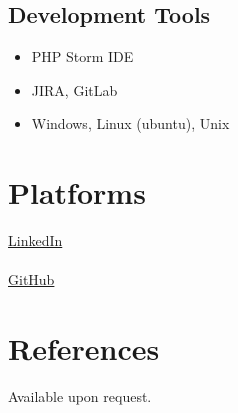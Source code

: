 \documentclass[a4paper, 10pt]{article}
\begin{document}
	\subsection*{Development Tools}
	\begin{itemize}
		\item PHP Storm IDE
		\item JIRA, GitLab
		\item Windows, Linux (ubuntu), Unix 
	\end{itemize}
	\section*{Platforms}
	\href{https://www.linkedin.com/in/david-buttler/}{LinkedIn}\\\\
	\href{https://github.com/dwbuttler}{GitHub}
	\section*{References}
	Available upon request.
\end{document}
